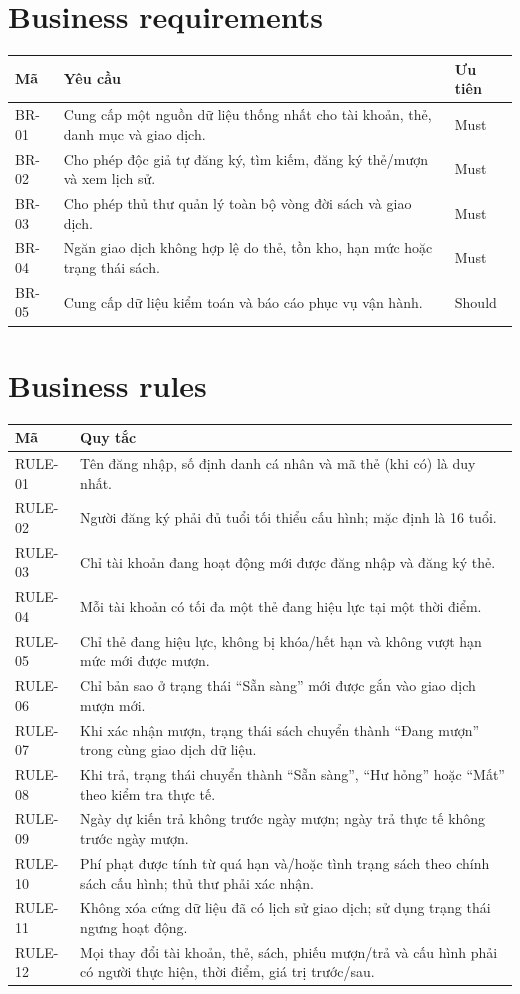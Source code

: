 \documentclass[12pt,a4paper,oneside]{report}
\begin{document}
\section{Business requirements}
\begin{longtable}{L{2cm}L{10.2cm}L{2.3cm}}
\toprule Mã & Yêu cầu & Ưu tiên\\\midrule\endhead
BR-01 & Cung cấp một nguồn dữ liệu thống nhất cho tài khoản, thẻ, danh mục và giao dịch. & Must\\
BR-02 & Cho phép độc giả tự đăng ký, tìm kiếm, đăng ký thẻ/mượn và xem lịch sử. & Must\\
BR-03 & Cho phép thủ thư quản lý toàn bộ vòng đời sách và giao dịch. & Must\\
BR-04 & Ngăn giao dịch không hợp lệ do thẻ, tồn kho, hạn mức hoặc trạng thái sách. & Must\\
BR-05 & Cung cấp dữ liệu kiểm toán và báo cáo phục vụ vận hành. & Should\\
\bottomrule
\end{longtable}

\section{Business rules}
\begin{longtable}{L{2cm}L{12.5cm}}
\toprule Mã & Quy tắc\\\midrule\endhead
RULE-01 & Tên đăng nhập, số định danh cá nhân và mã thẻ (khi có) là duy nhất.\\
RULE-02 & Người đăng ký phải đủ tuổi tối thiểu cấu hình; mặc định là 16 tuổi.\\
RULE-03 & Chỉ tài khoản đang hoạt động mới được đăng nhập và đăng ký thẻ.\\
RULE-04 & Mỗi tài khoản có tối đa một thẻ đang hiệu lực tại một thời điểm.\\
RULE-05 & Chỉ thẻ đang hiệu lực, không bị khóa/hết hạn và không vượt hạn mức mới được mượn.\\
RULE-06 & Chỉ bản sao ở trạng thái ``Sẵn sàng'' mới được gắn vào giao dịch mượn mới.\\
RULE-07 & Khi xác nhận mượn, trạng thái sách chuyển thành ``Đang mượn'' trong cùng giao dịch dữ liệu.\\
RULE-08 & Khi trả, trạng thái chuyển thành ``Sẵn sàng'', ``Hư hỏng'' hoặc ``Mất'' theo kiểm tra thực tế.\\
RULE-09 & Ngày dự kiến trả không trước ngày mượn; ngày trả thực tế không trước ngày mượn.\\
RULE-10 & Phí phạt được tính từ quá hạn và/hoặc tình trạng sách theo chính sách cấu hình; thủ thư phải xác nhận.\\
RULE-11 & Không xóa cứng dữ liệu đã có lịch sử giao dịch; sử dụng trạng thái ngưng hoạt động.\\
RULE-12 & Mọi thay đổi tài khoản, thẻ, sách, phiếu mượn/trả và cấu hình phải có người thực hiện, thời điểm, giá trị trước/sau.\\
\bottomrule
\end{longtable}
\end{document}
